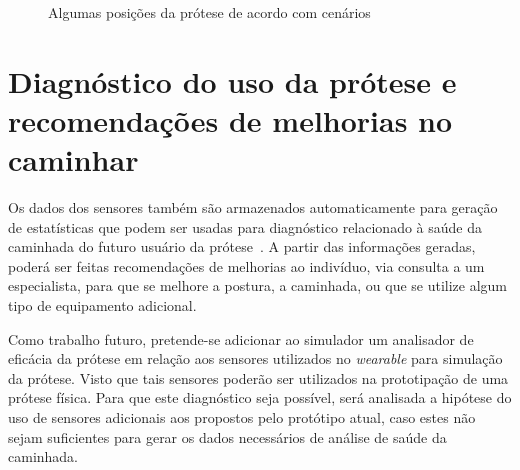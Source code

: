 \begin{figure}[h]
	\caption{\label{fig:hardware_poses}Algumas posições da prótese de acordo com cenários}
	\begin{center}
	\end{center}
\end{figure}


\section{Diagnóstico do uso da prótese e recomendações de melhorias no caminhar}\label{sec:metodo_diagnostico}

Os dados dos sensores também são armazenados automaticamente para geração de estatísticas que podem ser usadas para diagnóstico relacionado à saúde da caminhada do futuro usuário da prótese~\cite{SabatiniMSC05}. 
A partir das informações geradas, poderá ser feitas recomendações de melhorias ao indivíduo, via consulta a um especialista, para que se melhore a postura, a caminhada, ou que se utilize algum tipo de equipamento adicional. 

Como trabalho futuro, pretende-se adicionar ao simulador um analisador de eficácia da prótese em relação aos sensores utilizados no \textit{wearable} para simulação da prótese. Visto que tais sensores poderão ser utilizados na prototipação de uma prótese física.  
Para que este diagnóstico seja possível, será analisada a hipótese do uso de sensores adicionais aos propostos pelo protótipo atual, caso estes não sejam suficientes para gerar os dados necessários de análise de saúde da caminhada.